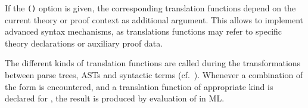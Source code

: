 \begin{isabellebody}
\begin{isamarkuptext}
  If the \verb|(|\hyperlink{keyword.advanced}{\mbox{}}\verb|)| option is
  given, the corresponding translation functions depend on the current
  theory or proof context as additional argument.  This allows to
  implement advanced syntax mechanisms, as translations functions may
  refer to specific theory declarations or auxiliary proof data.%
\end{isamarkuptext}%
\isamarkuptrue%
%
\isamarkuptrue%
%
\begin{isamarkuptext}%
The different kinds of translation functions are called during
  the transformations between parse trees, ASTs and syntactic terms
  (cf.\ ).  Whenever a combination of the form
   is encountered, and a translation function
   of appropriate kind is declared for , the
  result is produced by evaluation of  in ML.


\end{isamarkuptext}
\end{isabellebody}
